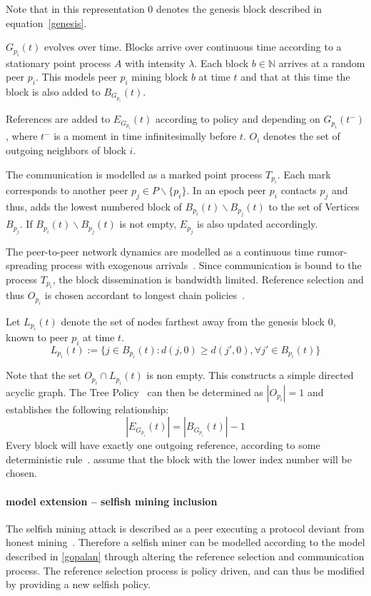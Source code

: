 Note that in this representation $0$ denotes the genesis block described in equation~\ref{genesis}.

$G_{p_i}(t)$ evolves over time. Blocks arrive over continuous time according to a stationary point process $A$ with intensity $\lambda$. Each block $b \in \mathbb{N}$ arrives at a random peer $p_i$.
This models peer $p_i$ mining block $b$ at time $t$ and that at this time the block is also added to $B_{G_{p_i}}(t)$.

References are added to $E_{G_{p_i}}(t)$ according to policy and depending on $G_{p_i}(t^-)$, where $t^-$ is a moment in time infinitesimally before $t$. $O_i$ denotes the set of outgoing neighbors of block $i$.

The communication is modelled as a marked point process $T_{p_i}$.
Each mark corresponds to another peer $p_j \in P\backslash \{p_i\}$.
In an epoch peer $p_i$ contacts $p_j$ and thus, adds the lowest numbered block of $B_{p_i}(t)\backslash B_{p_j}(t)$ to the set of Vertices $B_{p_j}$. If $B_{p_i}(t)\backslash B_{p_j}(t)$ is not empty, $E_{p_j}$ is also updated accordingly.

The peer-to-peer network dynamics are modelled as a continuous time rumor-spreading process with exogenous arrivals~\citep{gopalan}. Since communication is bound to the process $T_{p_i}$, the block dissemination is bandwidth limited.
Reference selection and thus $O_{p_i}$ is chosen accordant to longest chain policies~\citep{gopalan}.

Let $L_{p_i}(t)$ denote the set of nodes farthest away from the genesis block $0$, known to peer $p_i$ at time $t$.
\begin{equation}
L_{p_i}(t) := \{j \in B_{p_i}(t): d(j,0)\geq d(j',0), \forall j' \in B_{p_i}(t) \}
\label{policy}
\end{equation}

Note that the set $O_{p_i} \cap L_{p_i}(t)$ is non empty. This constructs a simple directed acyclic graph. The Tree Policy~\citep{gopalan} can then be determined as $|O_{p_i}|=1$ and establishes the following relationship:
\begin{equation}
|E_{G_{p_i}}(t)| = |B_{G_{p_i}}(t)| -1
\end{equation}
Every block will have exactly one outgoing reference, according to some deterministic rule~\citep{gopalan}. \citeauthor{gopalan} assume that the block with the lower index number will be chosen.


\paragraph{model extension -- selfish mining inclusion}
The selfish mining attack is described as a peer executing a protocol deviant from honest mining~\citep{eyal}. Therefore a selfish miner can be modelled according to the model described in \ref{gopalan} through altering the reference selection and communication process. The reference selection process is policy driven, and can thus be modified by providing a new selfish policy. 

